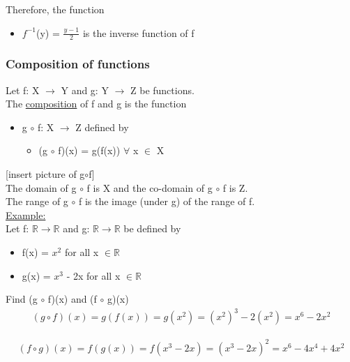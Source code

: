 \documentclass{article}
\begin{document}
Therefore, the function
\begin{itemize}
\item $f^{-1}$(y) = $\frac{y-1}{2}$ is the inverse function of f
\end{itemize}

\subsubsection{Composition of functions}

Let f: X $\longrightarrow$ Y and g: Y $\longrightarrow$ Z be functions. \\

The \underline{composition} of f and g is the function

\begin{itemize}
\item g $\circ$ f: X $\longrightarrow$ Z defined by
\begin{itemize}
\item (g $\circ$ f)(x) = g(f(x)) $\forall$ x $\in$ X
\end{itemize}
\end{itemize}

[insert picture of g$\circ$f] \\

The domain of g $\circ$ f is X and the co-domain of g $\circ$ f is Z. \\

The range of g $\circ$ f is the image (under g) of the range of f. \\

\underline{Example:} \\
Let f: $\mathbb{R} \longrightarrow \mathbb{R}$ and g: $\mathbb{R} \longrightarrow \mathbb{R}$ be defined by 
\begin{itemize}
\item f(x) = $x^{2}$ for all x $\in \mathbb{R}$
\item g(x) = $x^{3}$ - 2x for all x $\in \mathbb{R}$
\end{itemize}

Find (g $\circ$ f)(x) and (f $\circ$ g)(x)
\begin{align}
(g \circ f)(x) = g(f(x))
= g(x^{2})
= (x^{2})^{3} - 2(x^{2})
= x^{6} - 2x^{2}
\end{align}

\begin{align}
(f \circ g)(x) = f(g(x))
= f(x^{3} - 2x)
= (x^{3} - 2x)^{2}
= x^{6} - 4x^{4}+ 4x^{2}
\end{align}
\end{document}
